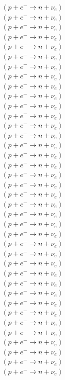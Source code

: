 \documentclass{article}
\begin{document}
\begin{multicols}{3}
$(p + e^{-}\rightarrow n + \nu_{e})$\\
$(p + e^{-}\rightarrow n + \nu_{e})$\\
$(p + e^{-}\rightarrow n + \nu_{e})$\\
$(p + e^{-}\rightarrow n + \nu_{e})$\\
$(p + e^{-}\rightarrow n + \nu_{e})$\\
$(p + e^{-}\rightarrow n + \nu_{e})$\\
$(p + e^{-}\rightarrow n + \nu_{e})$\\
$(p + e^{-}\rightarrow n + \nu_{e})$\\
$(p + e^{-}\rightarrow n + \nu_{e})$\\
$(p + e^{-}\rightarrow n + \nu_{e})$\\
$(p + e^{-}\rightarrow n + \nu_{e})$\\
$(p + e^{-}\rightarrow n + \nu_{e})$\\
$(p + e^{-}\rightarrow n + \nu_{e})$\\
$(p + e^{-}\rightarrow n + \nu_{e})$\\
$(p + e^{-}\rightarrow n + \nu_{e})$\\
$(p + e^{-}\rightarrow n + \nu_{e})$\\
$(p + e^{-}\rightarrow n + \nu_{e})$\\
$(p + e^{-}\rightarrow n + \nu_{e})$\\
$(p + e^{-}\rightarrow n + \nu_{e})$\\
$(p + e^{-}\rightarrow n + \nu_{e})$\\
$(p + e^{-}\rightarrow n + \nu_{e})$\\
$(p + e^{-}\rightarrow n + \nu_{e})$\\
$(p + e^{-}\rightarrow n + \nu_{e})$\\
$(p + e^{-}\rightarrow n + \nu_{e})$\\
$(p + e^{-}\rightarrow n + \nu_{e})$\\
$(p + e^{-}\rightarrow n + \nu_{e})$\\
$(p + e^{-}\rightarrow n + \nu_{e})$\\
$(p + e^{-}\rightarrow n + \nu_{e})$\\
$(p + e^{-}\rightarrow n + \nu_{e})$\\
$(p + e^{-}\rightarrow n + \nu_{e})$\\
$(p + e^{-}\rightarrow n + \nu_{e})$\\
$(p + e^{-}\rightarrow n + \nu_{e})$\\
$(p + e^{-}\rightarrow n + \nu_{e})$\\
$(p + e^{-}\rightarrow n + \nu_{e})$\\
$(p + e^{-}\rightarrow n + \nu_{e})$\\
$(p + e^{-}\rightarrow n + \nu_{e})$\\
$(p + e^{-}\rightarrow n + \nu_{e})$\\
$(p + e^{-}\rightarrow n + \nu_{e})$\\


\end{multicols}
 
\end{document}
